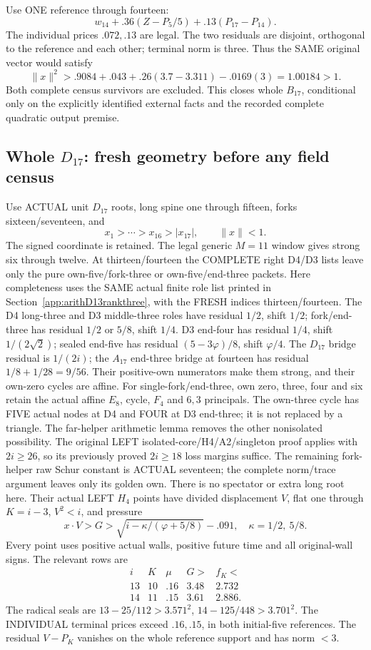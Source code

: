 Use ONE reference through fourteen:
\[
                   w_{14}+.36(Z-P_5/5)+.13(P_{17}-P_{14}).
\]
The individual prices \(.072,.13\) are legal.
The two residuals are disjoint, orthogonal to
the reference and each other; terminal norm is three.
Thus the SAME original vector would satisfy
\[
 \|x\|^2>.9084+.043+.26(3.7-3.311)-.0169(3)
                              =1.00184>1 .
\]
Both complete census survivors are excluded.
This closes whole \(B_{17}\), conditional only
on the explicitly identified external facts and
the recorded complete quadratic output premise.

\subsection{Whole \(D_{17}\): fresh geometry before any field census}
\label{app:arithD17geometry}

Use ACTUAL unit \(D_{17}\) roots, long spine one
through fifteen, forks sixteen/seventeen, and
\[
 x_1>\cdots>x_{16}>|x_{17}|,\qquad\|x\|<1 .
\]
The signed coordinate is retained.
The legal generic \(M=11\) window gives strong
six through twelve.
At thirteen/fourteen the COMPLETE right D4/D3
lists leave only the pure own-five/fork-three
or own-five/end-three packets.
Here completeness uses the SAME actual finite
role list printed in Section~\ref{app:arithD13rankthree},
with the FRESH indices thirteen/fourteen.
The D4 long-three and D3 middle-three roles have
residual \(1/2\), shift \(1/2\);
fork/end-three has residual \(1/2\) or \(5/8\),
shift \(1/4\).
D3 end-four has residual \(1/4\), shift
\(1/(2\sqrt2)\); sealed end-five has residual
\((5-3\varphi)/8\), shift \(\varphi/4\).
The \(D_{17}\) bridge residual is \(1/(2i)\);
the \(A_{17}\) end-three bridge at fourteen
has residual \(1/8+1/28=9/56\).
Their positive-own numerators make them strong,
and their own-zero cycles are affine.
For single-fork/end-three, own zero, three,
four and six retain the actual affine \(E_8\),
cycle, \(F_4\) and \(6,3\) principals.
The own-three cycle has FIVE actual nodes at
D4 and FOUR at D3 end-three; it is not
replaced by a triangle.
The far-helper arithmetic lemma removes the
other nonisolated possibility.
The original LEFT isolated-core/H4/A2/singleton
proof applies with \(2i\ge26\), so its previously
proved \(2i\ge18\) loss margins suffice.
The remaining fork-helper raw Schur constant
is ACTUAL seventeen; the complete norm/trace
argument leaves only its golden own.
There is no spectator or extra long root here.
Their actual LEFT \(H_4\) points have divided
displacement \(V\), flat one through \(K=i-3\),
\(V^2<i\), and pressure
\[
 x\cdot V>G>\sqrt{i-\kappa/(\varphi+5/8)}-.091,\quad
 \kappa=1/2,\ 5/8 .
\]
Every point uses positive actual walls, positive
future time and all original-wall signs.
The relevant rows are
\[
\begin{array}{c|c|c|c|c}
 i&K&\mu&G>&f_K<\\ \hline
13&10&.16&3.48&2.732\\
14&11&.15&3.61&2.886 .
\end{array}
\]
The radical seals are
\(13-25/112>3.571^2\),
\(14-125/448>3.701^2\).
The INDIVIDUAL terminal prices exceed
\(.16,.15\), in both initial-five references.
The residual \(V-P_K\) vanishes on the whole
reference support and has norm \(<3\).

